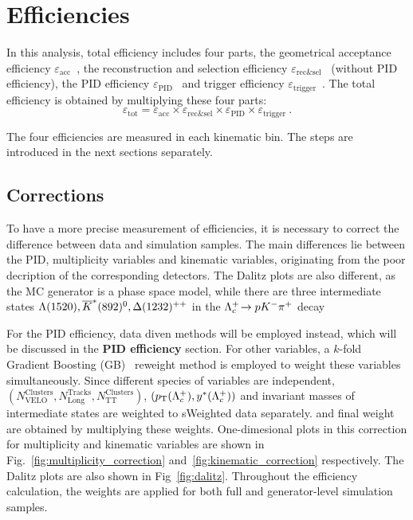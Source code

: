 \def\effacc {\ensuremath{\varepsilon_{\mathrm{acc}}\xspace}}
\def\effsel {\ensuremath{\varepsilon_{\mathrm{rec\&sel}}\xspace}}
\def\effpid {\ensuremath{\varepsilon_{\mathrm{PID}}\xspace}}
\def\efftri {\ensuremath{\varepsilon_{\mathrm{trigger}}\xspace}}
\def\efftot {\ensuremath{\varepsilon_{\mathrm{tot}}\xspace}}
\def\nVeloClusters {\ensuremath{N_\mathrm{VELO}^\mathrm{Clusters}}}
\def\nTTClusters {\ensuremath{N_\mathrm{TT}^{\mathrm{Clusters}}}}
\def\nLongTracks {\ensuremath{N_\mathrm{Long}^{\mathrm{Tracks}}}}
\section{Efficiencies}
\label{sec:efficiency}
In this analysis, total efficiency includes four parts,
the geometrical acceptance efficiency \effacc~,
the reconstruction and selection efficiency \effsel~ (without PID efficiency),
the PID efficiency \effpid~ and trigger efficiency \efftri~.
The total efficiency is obtained by multiplying these four parts:
\begin{equation}\label{eqn:eff_total}
    \efftot = \effacc \times \effsel \times \effpid \times \efftri~.
\end{equation}

The four efficiencies are measured in each kinematic bin.
The steps are introduced in the next sections separately.

\subsection{Corrections}
To have a more precise measurement of efficiencies,
it is necessary to correct the difference between data and simulation samples.
The main differences lie between the PID, multiplicity variables and kinematic variables,
originating from the poor decription of the corresponding detectors.
The Dalitz plots are also different,
as the \Lc MC generator is a phase space model,
while there are three intermediate states
$\Lambda(1520), \overline{K}^*(892)^{0}, \Delta(1232)^{++}$
in the ${{\Lambda}^+_{c}}\!\rightarrow {\ensuremath{p}}{\ensuremath{{K}^-}}{\ensuremath{{\pi}^+}}$ decay

For the PID efficiency, data diven methods will be employed instead,
which will be discussed in the {\bf PID efficiency} section.
For other variables, a $k$-fold Gradient Boosting (GB)~\cite{Friedman2001GreedyFA}
reweight method is employed to weight these variables simultaneously.
Since different species of variables are independent,
$(\nVeloClusters, \nLongTracks, \nTTClusters)$,
$(p_{\mathrm{T}}({{\Lambda}^+_{c}}), y^*({{\Lambda}^+_{c}}))$ and invariant masses of intermediate states
are weighted to sWeighted data separately.
and final weight are obtained by multiplying these weights.
One-dimesional plots in this correction for multiplicity and kinematic variables are shown
in Fig.~\ref{fig:multiplicity_correction} and~\ref{fig:kinematic_correction} respectively.
The Dalitz plots are also shown in Fig~\ref{fig:dalitz}.
Throughout the efficiency calculation, the weights are applied for both full and generator-level simulation samples.

